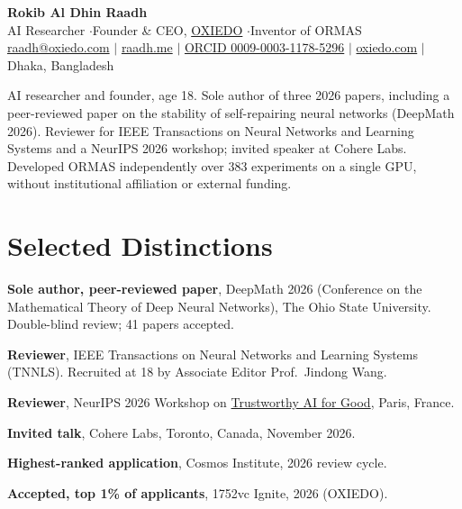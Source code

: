 \documentclass[10pt,a4paper]{article}
\begin{document}
\RaggedRight
\color{body}

\begin{center}
  {\LARGE\bfseries\color{heading} Rokib Al Dhin Raadh}\\[3pt]
  {\small AI Researcher \enspace$\cdot$\enspace Founder \& CEO, \href{https://oxiedo.com}{OXIEDO} \enspace$\cdot$\enspace Inventor of ORMAS}\\[3pt]
  {\footnotesize
    \href{mailto:raadh@oxiedo.com}{raadh@oxiedo.com}
    \enspace$|$\enspace
    \href{https://www.raadh.me}{raadh.me}
    \enspace$|$\enspace
    \href{https://orcid.org/0009-0003-1178-5296}{ORCID 0009-0003-1178-5296}
    \enspace$|$\enspace
    \href{https://oxiedo.com}{oxiedo.com}
    \enspace$|$\enspace
    {\color{muted}Dhaka, Bangladesh}
  }
\end{center}
\vspace{1pt}

{\small\noindent AI researcher and founder, age 18. Sole author of three 2026 papers, including a peer-reviewed paper on the stability of self-repairing neural networks (DeepMath 2026). Reviewer for IEEE Transactions on Neural Networks and Learning Systems and a NeurIPS 2026 workshop; invited speaker at Cohere Labs. Developed ORMAS independently over 383 experiments on a single GPU, without institutional affiliation or external funding.\par}

\section*{Selected Distinctions}
\begin{bullets}
  \item \textbf{Sole author, peer-reviewed paper}, DeepMath 2026 (Conference on the Mathematical Theory of Deep Neural Networks), The Ohio State University. Double-blind review; 41 papers accepted.
  \item \textbf{Reviewer}, IEEE Transactions on Neural Networks and Learning Systems (TNNLS). Recruited at 18 by Associate Editor Prof.~Jindong Wang.
  \item \textbf{Reviewer}, NeurIPS 2026 Workshop on \href{https://trustworthy-ai-for-good.github.io/}{Trustworthy AI for Good}, Paris, France.
  \item \textbf{Invited talk}, Cohere Labs, Toronto, Canada, November 2026.
  \item \textbf{Highest-ranked application}, Cosmos Institute, 2026 review cycle.
  \item \textbf{Accepted, top 1\% of applicants}, 1752vc Ignite, 2026 (OXIEDO).
\end{bullets}
\end{document}
